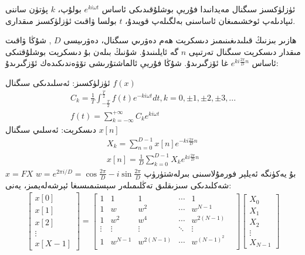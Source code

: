 ئۈزلۈكسىز سىگنال مەيدانىدا فۇريې بوشلۇقىدىكى ئاساس $e^{ki \omega t}$ بولۇپ، $k$ پۈتۈن ساننى ئىپادىلەپ ئوخشىمىغان ئاساسنى بەلگىلەپ قويىدۇ، $t$ بولسا ۋاقىت ئۈزلۈكسىز مىقدارى.

ھازىر بىزنىڭ قىلىدىغىنىمىز دىسكرېت ھەم دەۋرىي سىگنال، دەۋرىيسى $D$ , شۇڭا ۋاقىت مىقدار دىسكرېت سىگنال تەرتىپى $n$ گە ئايلىنىدۇ. شۇنىڭ بىلەن بۇ دىسكرېت بوشلۇقتىكى ئاساس $e^{ki \frac{2 \pi}{D} n}$ غا ئۆزگىرىدۇ. شۇڭا فۇريې ئالماشتۇرىشى تۆۋەندىكىدەك ئۆزگىرىدۇ:

ئۈزلۈكسىز: ئەسلىدىكى سىگنال $f(x)$ 
\begin{align*}
C_k = \frac{1}{T} \int_{-\frac{T}{2}}^{\frac{T}{2}} f(t)e^{-ki \omega t}dt , k=0, \pm 1, \pm 2 , \pm 3, ... \\
f(t) = \sum_{k=-\infty}^{+\infty}C_k e^{ki \omega t}
\end{align*}
دىسكرېت: ئەسلىي سىگنال $x[n]$ 
\begin{align*}
X_k = \sum_{n=0}^{D-1}x[n] e^{-ki \frac{2 \pi}{D} n}
\\
x[n] = \frac{1}{D}\sum_{k=0}^{D-1}X_k e^{ki \frac{2 \pi}{D} n}
\end{align*}
بۇ يەكۈنگە ئەيلېر فورمۇلاسىنى بىرلەشتۈرۈپ 
$w = e^{2 \pi i/D} = \cos \frac{2 \pi}{D} -i \sin \frac{2 \pi}{D}$ 
$x=FX$
 شەكلىدىكى سىزىقلىق تەڭلىمىلەر سېستىمىسىغا ئېرشەلەيمىز، يەنى:
\begin{align*}
 \begin{bmatrix}
	x[0] \\
	x[1] \\
	x[2] \\
	\vdots \\
	x[X-1]
\end{bmatrix} 
=
\begin{bmatrix}
	1& 1& 1& \cdots & 1 \\
	1& w& w^2& \cdots & w^{N-1} \\
	1& w^2& w^4& \cdots & w^{2(N-1)} \\
	\vdots & \vdots & \vdots & \ddots & \vdots &\\
	1& w^{N-1}& w^{2(N-1)}& \cdots & w^{(N-1)^2} \\
\end{bmatrix}
\begin{bmatrix}
	X_0 \\
	X_1 \\
	X_2 \\
	\vdots \\
	X_{N-1}
\end{bmatrix}
\end{align*}

